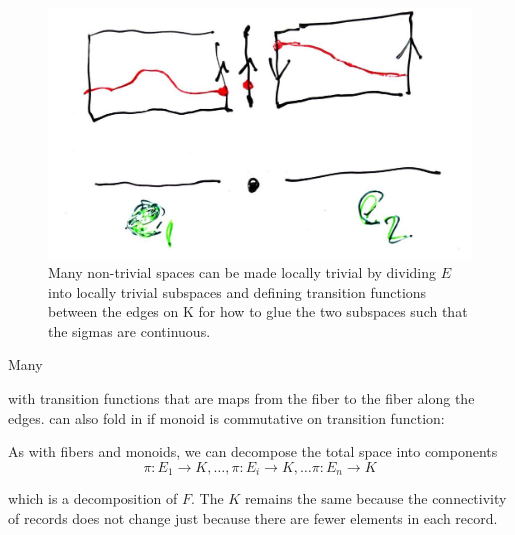 \documentclass[../main.tex]{subfiles}
\begin{document}
\begin{figure}
    \label{fig:data_base_transition}
    \includegraphics[width=\textwidth]{figures/math/transition_functions.png}
    \caption{Many non-trivial spaces can be made locally trivial by dividing $E$ into locally trivial subspaces and defining transition functions between the edges on K for how to glue the two subspaces such that the sigmas are continuous.}
\end{figure}

Many

with transition functions that are maps from the fiber to the fiber along the edges. can also fold in if monoid is commutative on transition function:


As with fibers and monoids, we can decompose the total space into components 
\begin{equation}
    \pi: E_1 \rightarrow K, \ldots, \pi: E_i \rightarrow K, \ldots \pi: E_n \rightarrow K
\end{equation}

which is a decomposition of $F$. The $K$ remains the same because the connectivity of records does not change just because there are fewer elements in each record.
\end{document}
